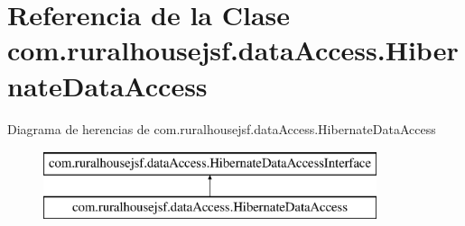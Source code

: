 \hypertarget{classcom_1_1ruralhousejsf_1_1data_access_1_1_hibernate_data_access}{}\section{Referencia de la Clase com.\+ruralhousejsf.\+data\+Access.\+Hibernate\+Data\+Access}
\label{classcom_1_1ruralhousejsf_1_1data_access_1_1_hibernate_data_access}
Diagrama de herencias de com.\+ruralhousejsf.\+data\+Access.\+Hibernate\+Data\+Access\begin{figure}[H]
\begin{center}
\leavevmode
\includegraphics[height=2.000000cm]{classcom_1_1ruralhousejsf_1_1data_access_1_1_hibernate_data_access}
\end{center}
\end{figure}
